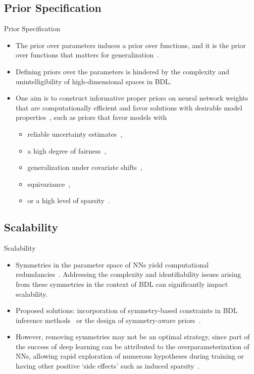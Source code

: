 \documentclass[9pt,handout]{beamer}
\begin{document}
\subsection{Prior Specification}

\begin{frame}{Prior Specification}
\begin{itemize}[<+->]
	\item The prior \alert{over parameters} induces a prior \alert{over functions}, and it is the prior over functions that matters for generalization~\citep{wilson2020bayesian}. 
	\item Defining priors over the parameters is hindered by the complexity and unintelligibility of high-dimensional spaces in BDL. 
	\item One aim is to construct informative proper priors on neural network weights that are \alert{computationally efficient} and \alert{favor solutions with desirable model properties}~\citep{vladimirova2019bayesian,fortuin2022bayesian,rudner2023fseb}, such as priors that favor models with 
	\begin{itemize}
		\item reliable uncertainty estimates~\citep{rudner2023uap}, 
		\item a high degree of fairness~\citep{rudner2024gap}, 
		\item generalization under covariate shifts~\citep{klarner2023qsavi}, 
		\item equivariance~\citep{finzi2021residual}, 
		\item or a high level of sparsity~\citep{ghosh2018structured,polson2018posterior,hubin2019combining}.
	\end{itemize}
\end{itemize}
\end{frame}

\subsection{Scalability}

\begin{frame}{Scalability}
\begin{itemize}[<+->]
	\item \alert{Symmetries} in the parameter space of NNs yield \alert{computational redundancies}~\citep{wiese2023}. Addressing the complexity and identifiability issues arising from these symmetries in the context of BDL can significantly impact \alert{scalability}.
	\item Proposed solutions: incorporation of \alert{symmetry-based constraints} in BDL inference methods~\citep{sen2024} or the design of \alert{symmetry-aware priors}~\citep{atzeni2023infusing}. %
	\item However, removing symmetries may not be an optimal strategy, since part of the success of deep learning can be attributed to the overparameterization of NNs, allowing rapid exploration of numerous hypotheses during training or having other positive `side effects' such as induced sparsity~\citep{kolb2023}. %
\end{itemize}
\end{frame}
\end{document}
